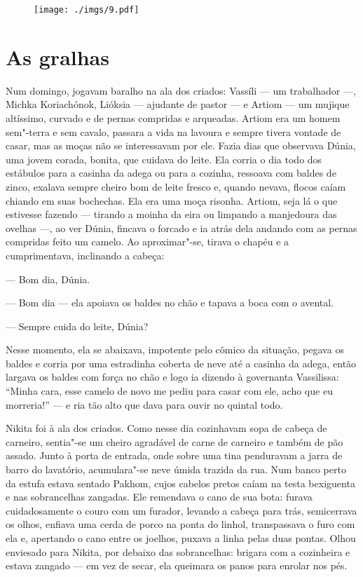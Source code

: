 \begin{figure}
\vspace*{-2.1cm}
\hspace*{-2.5cm}\texttt{[image: ./imgs/9.pdf]}
\end{figure}

\chapter{As gralhas}

Num domingo, jogavam baralho na ala dos criados: Vassíli --- um
trabalhador ---, Michka Koriachónok, Lióksia --- ajudante de pastor ---
e Artiom --- um mujique altíssimo, curvado e de pernas compridas e
arqueadas. Artiom era um homem sem"-terra e sem cavalo, passara a vida na
lavoura e sempre tivera vontade de casar, mas as moças não se
interessavam por ele. Fazia dias que observava Dúnia, uma jovem corada,
bonita, que cuidava do leite. Ela corria o dia todo dos estábulos para a
casinha da adega ou para a cozinha, ressoava com baldes de zinco,
exalava sempre cheiro bom de leite fresco e, quando nevava, flocos caíam
chiando em suas bochechas. Ela era uma moça risonha. Artiom, seja lá o
que estivesse fazendo --- tirando a moinha da eira ou limpando a
manjedoura das ovelhas ---, ao ver Dúnia, fincava o forcado e ia atrás
dela andando com as pernas compridas feito um camelo. Ao aproximar"-se,
tirava o chapéu e a cumprimentava, inclinando a cabeça:

--- Bom dia, Dúnia.

--- Bom dia --- ela apoiava os baldes no chão e tapava a boca com o
avental.

--- Sempre cuida do leite, Dúnia?

Nesse momento, ela se abaixava, impotente pelo cômico da situação,
pegava os baldes e corria por uma estradinha coberta de neve até a
casinha da adega, então largava os baldes com força no chão e logo ia
dizendo à governanta Vassilissa: ``Minha cara, esse camelo de novo me
pediu para casar com ele, acho que eu morreria!'' --- e ria tão alto que
dava para ouvir no quintal todo.

Nikita foi à ala dos criados. Como nesse dia cozinhavam sopa de cabeça
de carneiro, sentia"-se um cheiro agradável de carne de carneiro e também
de pão assado. Junto à porta de entrada, onde sobre uma tina penduravam
a jarra de barro do lavatório, acumulara"-se neve úmida trazida
da rua. Num banco perto da estufa estava sentado Pakhom, cujos cabelos
pretos caíam na testa bexiguenta e nas sobrancelhas zangadas. Ele
remendava o cano de sua bota: furava cuidadosamente o couro com um
furador, levando a cabeça para trás, semicerrava os olhos, enfiava uma
cerda de porco na ponta do linhol, transpassava o furo com ela e,
apertando o cano entre os joelhos, puxava a linha pelas duas pontas.
Olhou enviesado para Nikita, por debaixo das sobrancelhas: brigara com a
cozinheira e estava zangado --- em vez de secar, ela queimara os panos
para enrolar nos pés.


